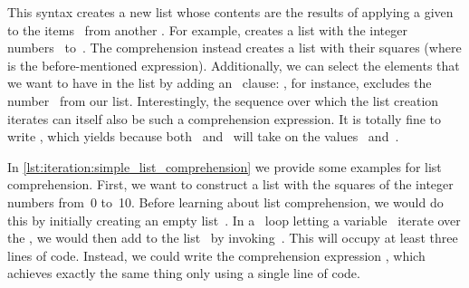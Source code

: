\begin{sloppypar}%
This syntax creates a new list whose contents are the results of applying a given  to the items~ from another .
For example,  creates a list with the integer numbers~ to~.
The comprehension  instead creates a list with their squares (where  is the before-mentioned expression).
Additionally, we can select the elements that we want to have in the list by adding an ~clause:
\pythonil{[i for i in range(10) if i != 3]}, for instance, excludes the number~ from our list.
Interestingly, the sequence over which the list creation iterates can itself also be such a comprehension expression.
It is totally fine to write , which yields \pythonil{[0, 0, 0, 1]} because both~ and~ will take on the values~ and~.%
\end{sloppypar}%
%
In \cref{lst:iteration:simple_list_comprehension} we provide some examples for list comprehension.
First, we want to construct a list with the squares of the integer numbers from~0 to~10.
Before learning about list comprehension, we would do this by initially creating an empty list~.
In a ~loop letting a variable~ iterate over the , we would then add  to the list~ by invoking~.
This will occupy at least three lines of code.
Instead, we could write the comprehension expression , which achieves exactly the same thing only using a single line of code.

